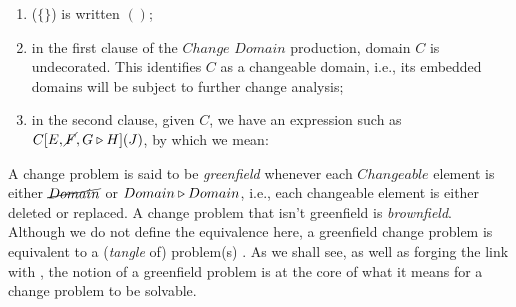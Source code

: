 \documentclass[runningheads,a4paper]{llncs}
\begin{document}
\begin{enumerate}
	\item ($\{\}$) is written $()$; 
	\item in the first clause of the $Change$ $Domain$ production, domain $C$ is undecorated. This identifies $C$ as a changeable domain, i.e., its embedded domains will be subject to further change analysis;
	\item in the second clause, given $C$, we have an expression such as $C[E, \cancel{F}, G\triangleright H](J)$, by which we mean:
\end{enumerate}

A change problem is said to be \textit{greenfield} whenever each $Changeable$ element is either $\cancel{Domain}$ or $Domain\triangleright Domain$, i.e., each changeable element is either deleted or replaced. A change problem that isn't greenfield is \textit{brownfield}. Although we do not define the equivalence here, a greenfield change problem is equivalent to a (\textit{tangle} of) \POE{} problem(s) \cite{hall2016a-design}. As we shall see, as well as forging the link with \POE{}, the notion of a greenfield problem is at the core of what it means for a change problem to be solvable.

\newcommand\zerothCP{E\Delta F\meets_G N}
\newcommand\firstCP{[\Java,\ColourMaker{}]\Delta \ColourMaker{}[CM[\cancel{\alpha}, \cancel{R},\cancel{G},\cancel{B}](\alpha RGB)]()\meets_G RTDNeed}
%
\end{document}
